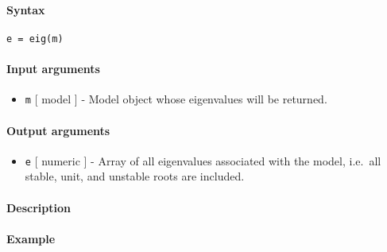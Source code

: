 


	\paragraph{Syntax}

\begin{verbatim}
e = eig(m)
\end{verbatim}

\paragraph{Input arguments}

\begin{itemize}
\itemsep1pt\parskip0pt
\item
  \texttt{m} {[} model {]} - Model object whose eigenvalues will be
  returned.
\end{itemize}

\paragraph{Output arguments}

\begin{itemize}
\itemsep1pt\parskip0pt
\item
  \texttt{e} {[} numeric {]} - Array of all eigenvalues associated with
  the model, i.e.~all stable, unit, and unstable roots are included.
\end{itemize}

\paragraph{Description}

\paragraph{Example}


